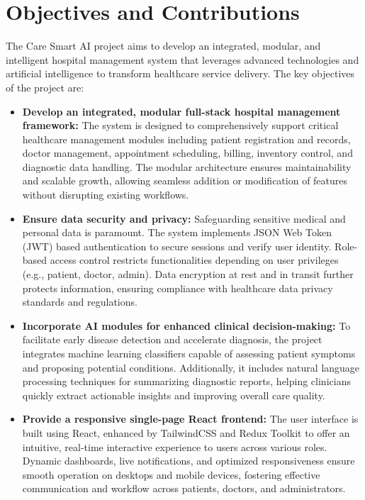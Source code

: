\documentclass[conference]{IEEEtran}
\begin{document}
\section{Objectives and Contributions}

The Care Smart AI project aims to develop an integrated, modular, and intelligent hospital management system that leverages advanced technologies and artificial intelligence to transform healthcare service delivery. The key objectives of the project are:

\begin{itemize}
    \item \textbf{Develop an integrated, modular full-stack hospital management framework:} The system is designed to comprehensively support critical healthcare management modules including patient registration and records, doctor management, appointment scheduling, billing, inventory control, and diagnostic data handling. The modular architecture ensures maintainability and scalable growth, allowing seamless addition or modification of features without disrupting existing workflows.

    \item \textbf{Ensure data security and privacy:} Safeguarding sensitive medical and personal data is paramount. The system implements JSON Web Token (JWT) based authentication to secure sessions and verify user identity. Role-based access control restricts functionalities depending on user privileges (e.g., patient, doctor, admin). Data encryption at rest and in transit further protects information, ensuring compliance with healthcare data privacy standards and regulations.

    \item \textbf{Incorporate AI modules for enhanced clinical decision-making:} To facilitate early disease detection and accelerate diagnosis, the project integrates machine learning classifiers capable of assessing patient symptoms and proposing potential conditions. Additionally, it includes natural language processing techniques for summarizing diagnostic reports, helping clinicians quickly extract actionable insights and improving overall care quality.

    \item \textbf{Provide a responsive single-page React frontend:} The user interface is built using React, enhanced by TailwindCSS and Redux Toolkit to offer an intuitive, real-time interactive experience to users across various roles. Dynamic dashboards, live notifications, and optimized responsiveness ensure smooth operation on desktops and mobile devices, fostering effective communication and workflow across patients, doctors, and administrators.


\end{itemize}
\end{document}
